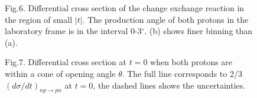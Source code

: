 \begin{figure}[hbt]
\begin{center}
\mbox{}
\end{center}
\vspace{0.4mm}
Fig.6. Differential cross section of the change exchange reaction in the
region of small $\vert t \vert$. The production angle of both protons in
the laboratory frame is in the interval 0-3$^{\circ}$. (b) shows finer
binning than (a).
\end{figure}
\begin{figure}[hbt]
\begin{center}
\mbox{}
\end{center}
\vspace{0.4mm}
Fig.7. Differential cross section at $t=0$ when both protons are within
a cone of opening angle $\theta$. The full line corresponds to 2/3
$(d\sigma/dt)_{np\to pn}$ at $t=0$, the dashed lines shows the uncertainties.
\end{figure}








